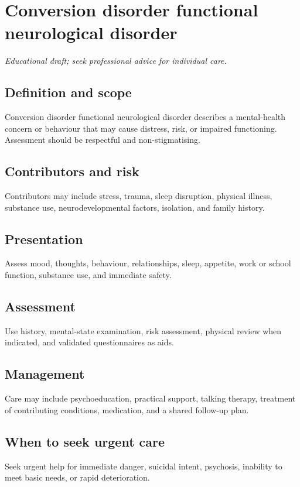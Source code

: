 \chapter{Conversion disorder functional neurological disorder}

\medskip
\noindent\textit{Educational draft; seek professional advice for individual care.}

\section*{Definition and scope}
Conversion disorder functional neurological disorder describes a mental-health concern or behaviour that may cause distress, risk, or impaired functioning. Assessment should be respectful and non-stigmatising.

\section*{Contributors and risk}
Contributors may include stress, trauma, sleep disruption, physical illness, substance use, neurodevelopmental factors, isolation, and family history.

\section*{Presentation}
Assess mood, thoughts, behaviour, relationships, sleep, appetite, work or school function, substance use, and immediate safety.

\section*{Assessment}
Use history, mental-state examination, risk assessment, physical review when indicated, and validated questionnaires as aids.

\section*{Management}
Care may include psychoeducation, practical support, talking therapy, treatment of contributing conditions, medication, and a shared follow-up plan.

\section*{When to seek urgent care}
Seek urgent help for immediate danger, suicidal intent, psychosis, inability to meet basic needs, or rapid deterioration.


